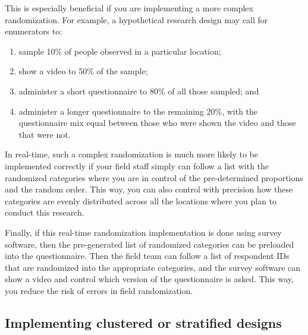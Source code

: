 \documentclass[
]{book}
\providecommand{\tightlist}{%
  \setlength{\itemsep}{0pt}\setlength{\parskip}{0pt}}
\begin{document}
This is especially beneficial if you are implementing a more complex randomization.
For example, a hypothetical research design may call for enumerators to:

\begin{enumerate}
\def\labelenumi{\arabic{enumi}.}
\tightlist
\item
  sample 10\% of people observed in a particular location;
\item
  show a video to 50\% of the sample;
\item
  administer a short questionnaire to 80\% of all those sampled; and
\item
  administer a longer questionnaire to the remaining 20\%, with the questionnaire mix equal between those who were shown the video and those that were not.
\end{enumerate}

In real-time, such a complex randomization is much more likely to be implemented correctly
if your field staff simply can follow a list with the randomized categories
where you are in control of the pre-determined proportions and the random order.
This way, you can also control with precision
how these categories are evenly distributed across all the locations
where you plan to conduct this research.

Finally, if this real-time randomization implementation is done using survey software,
then the pre-generated list of randomized categories can be preloaded
into the questionnaire.
Then the field team can follow a list of respondent IDs
that are randomized into the appropriate categories,
and the survey software can show a video and control which version of the questionnaire is asked.
This way, you reduce the risk of errors in field randomization.

\hypertarget{implementing-clustered-or-stratified-designs}{%
\subsection*{Implementing clustered or stratified designs}\label{implementing-clustered-or-stratified-designs}}
\end{document}
